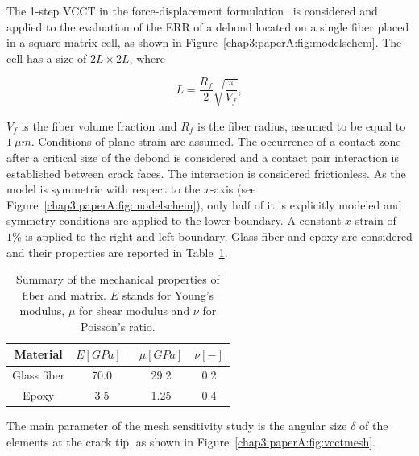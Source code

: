 The 1-step VCCT in the force-displacement formulation~\cite{Krueger2004} is considered and applied to the evaluation of the ERR of a debond located on a single fiber placed in a square matrix cell, as shown in Figure~\ref{chap3:paperA:fig:modelschem}. The cell has a size of $2L\times2L$, where

\begin{equation}\label{chap3:paperA:eq:LVf}
L=\frac{R_{f}}{2}\sqrt{\frac{\pi}{V_{f}}},
\end{equation}

$V_{f}$ is the fiber volume fraction and $R_{f}$ is the fiber radius, assumed to be equal to $1\ \mu m$. Conditions of plane strain are assumed. The occurrence of a contact zone after a critical size of the debond is considered and a contact pair interaction is established between crack faces. The interaction is considered frictionless. As the model is symmetric with respect to the $x$-axis (see Figure~\ref{chap3:paperA:fig:modelschem}), only half of it is explicitly modeled and symmetry conditions are applied to the lower boundary. A constant $x$-strain of $1\%$ is applied to the right and left boundary. Glass fiber and epoxy are considered and their properties are reported in Table~\ref{chap3:paperA:tab:phaseprop}.

\begin{table}[!htbp]
 \centering
 \caption{Summary of the mechanical properties of fiber and matrix. $E$ stands for Young's modulus, $\mu$ for shear modulus and $\nu$ for Poisson's ratio.}
 \begin{tabular}{cccc}
\\
\textbf{Material} & \textbf{$E\left[GPa\right]$}\ & \textbf{$\mu\left[GPa\right]$} & \textbf{$\nu\left[-\right]$} \\
\midrule
Glass fiber    & 70.0  & 29.2   & 0.2  \\
Epoxy    & 3.5    & 1.25   & 0.4
\end{tabular}
\label{chap3:paperA:tab:phaseprop}
\end{table}

The main parameter of the mesh sensitivity study is the angular size $\delta$ of the elements at the crack tip, as shown in Figure~\ref{chap3:paperA:fig:vcctmesh}.

